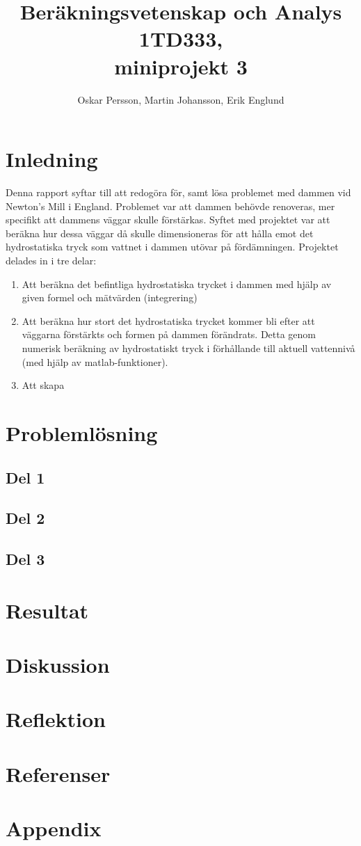 \documentclass[12pt,a4paper]{report}
\title{Beräkningsvetenskap och Analys 1TD333,\\ miniprojekt 3}
\begin{document}
\author{Oskar Persson, Martin Johansson, Erik Englund}
\maketitle
\tableofcontents
\section{Inledning}
Denna rapport syftar till att redogöra för, samt lösa problemet med dammen vid Newton's Mill i England. Problemet var att dammen behövde renoveras, mer specifikt att dammens väggar skulle förstärkas. Syftet med projektet var att beräkna hur dessa väggar då skulle dimensioneras för att hålla emot det hydrostatiska tryck som vattnet i dammen utövar på fördämningen. Projektet delades in i tre delar:\\
\begin{enumerate}
\item Att beräkna det befintliga hydrostatiska trycket i dammen med hjälp av given formel och mätvärden (integrering)\\
\item Att beräkna hur stort det hydrostatiska trycket kommer bli efter att väggarna förstärkts och formen på dammen förändrats. Detta genom numerisk beräkning av hydrostatiskt tryck i förhållande till aktuell vattennivå (med hjälp av matlab-funktioner).\\ 
\item Att skapa 
\end{enumerate}
\section{Problemlösning}
\subsection{Del 1}

\subsection{Del 2}
\subsection{Del 3}
\section{Resultat}
\section{Diskussion}
\section{Reflektion}
\section{Referenser}
\section{Appendix}
\end{document}

